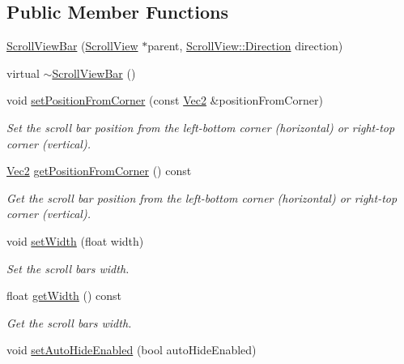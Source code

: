 \subsection*{Public Member Functions}
\begin{DoxyCompactItemize}
\item 
\hyperlink{classui_1_1ScrollViewBar_a3fe40127ee557a66d7dfa2eb41d9219b}{Scroll\+View\+Bar} (\hyperlink{classui_1_1ScrollView}{Scroll\+View} $\ast$parent, \hyperlink{classui_1_1ScrollView_aed2d778ae8098dcafe323b2beae8dd6b}{Scroll\+View\+::\+Direction} direction)
\item 
virtual \hyperlink{classui_1_1ScrollViewBar_a21c006194ad067853c595bbe4342a349}{$\sim$\+Scroll\+View\+Bar} ()
\item 
void \hyperlink{classui_1_1ScrollViewBar_a89cb4e9250dbc32036e970c18b2c8c08}{set\+Position\+From\+Corner} (const \hyperlink{classVec2}{Vec2} \&position\+From\+Corner)
\begin{DoxyCompactList}\small\item\em Set the scroll bar position from the left-\/bottom corner (horizontal) or right-\/top corner (vertical). \end{DoxyCompactList}\item 
\hyperlink{classVec2}{Vec2} \hyperlink{classui_1_1ScrollViewBar_a4f78c98f3dc3b7d612796d26a2f9416d}{get\+Position\+From\+Corner} () const
\begin{DoxyCompactList}\small\item\em Get the scroll bar position from the left-\/bottom corner (horizontal) or right-\/top corner (vertical). \end{DoxyCompactList}\item 
void \hyperlink{classui_1_1ScrollViewBar_aad9c46e5d319dcc2737af241753fc0b0}{set\+Width} (float width)
\begin{DoxyCompactList}\small\item\em Set the scroll bar\textquotesingle{}s width. \end{DoxyCompactList}\item 
float \hyperlink{classui_1_1ScrollViewBar_a9c5b59742146bf64bc2b3ca2e0c0b5f0}{get\+Width} () const
\begin{DoxyCompactList}\small\item\em Get the scroll bar\textquotesingle{}s width. \end{DoxyCompactList}\item 
void \hyperlink{classui_1_1ScrollViewBar_ab46804801caf07a301c0b94c43b05313}{set\+Auto\+Hide\+Enabled} (bool auto\+Hide\+Enabled)

\end{DoxyCompactItemize}
